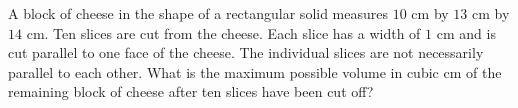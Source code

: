 A block of cheese in the shape of a rectangular solid measures $ 10$ cm by $ 13$ cm by $ 14$ cm. Ten slices are cut from the cheese. Each slice has a width of $ 1$ cm and is cut parallel to one face of the cheese. The individual slices are not necessarily parallel to each other. What is the maximum possible volume in cubic cm of the remaining block of cheese after ten slices have been cut off?
